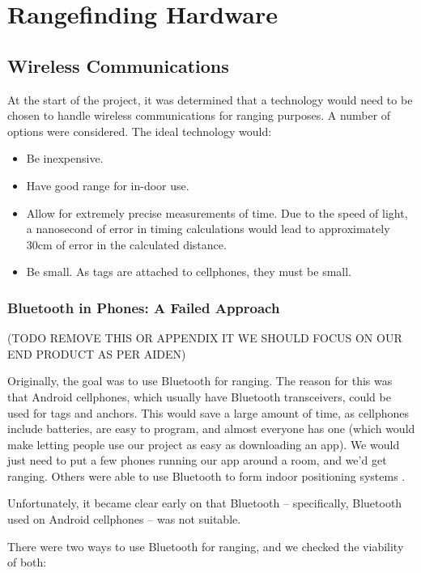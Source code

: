 
\chapter{Rangefinding Hardware} %

\label{RangefindingHardware}

\section{Wireless Communications}
At the start of the project, it was determined that a technology would need to be chosen to handle wireless communications for ranging purposes. A number of options were considered. The ideal technology would:
\begin{itemize}
	\item Be inexpensive.
	\item Have good range for in-door use.
	\item Allow for extremely precise measurements of time. Due to the speed of light, a nanosecond of error in timing calculations would lead to approximately 30cm of error in the calculated distance.
	\item Be small. As tags are attached to cellphones, they must be small.
\end{itemize}

\subsection{Bluetooth in Phones: A Failed Approach}
(TODO REMOVE THIS OR APPENDIX IT WE SHOULD FOCUS ON OUR END PRODUCT AS PER AIDEN) 

Originally, the goal was to use Bluetooth for ranging. The reason for this was that Android cellphones, which usually have Bluetooth transceivers, could be used for tags and anchors. This would save a large amount of time, as cellphones include batteries, are easy to program, and almost everyone has one (which would make letting people use our project as easy as downloading an app). We would just need to put a few phones running our app around a room, and we'd get ranging. Others were able to use Bluetooth to form indoor positioning systems \cite{BluetoothIndoor}.

Unfortunately, it became clear early on that Bluetooth -- specifically, Bluetooth used on Android cellphones -- was not suitable. 

There were two ways to use Bluetooth for ranging, and we checked the viability of both: 

